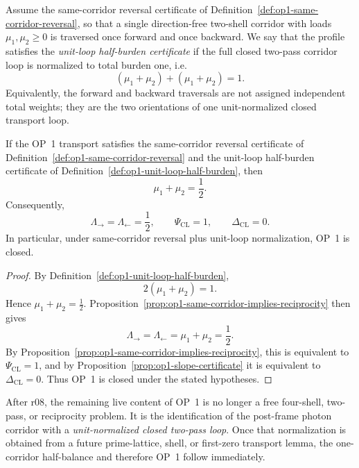 \begin{definition}
\label{def:op1-unit-loop-half-burden}
Assume the same-corridor reversal certificate of Definition~\ref{def:op1-same-corridor-reversal}, so that a single direction-free two-shell corridor with loads \(\mu_1,\mu_2\ge 0\) is traversed once forward and once backward. We say that the profile satisfies the \emph{unit-loop half-burden certificate} if the full closed two-pass corridor loop is normalized to total burden one, i.e.
\[
  (\mu_1+\mu_2)+(\mu_1+\mu_2)=1.
\]
Equivalently, the forward and backward traversals are not assigned independent total weights; they are the two orientations of one unit-normalized closed transport loop.
\end{definition}

\begin{proposition}
\label{prop:op1-unit-loop-half-burden}
If the OP~1 transport satisfies the same-corridor reversal certificate of Definition~\ref{def:op1-same-corridor-reversal} and the unit-loop half-burden certificate of Definition~\ref{def:op1-unit-loop-half-burden}, then
\[
  \mu_1+\mu_2=\frac12.
\]
Consequently,
\[
  \Lambda_{\rightarrow}=\Lambda_{\leftarrow}=\frac12,
\qquad
  \Psi_{\mathrm{CL}}=1,
\qquad
  \Delta_{\mathrm{CL}}=0.
\]
In particular, under same-corridor reversal plus unit-loop normalization, OP~1 is closed.
\end{proposition}

\begin{proof}
By Definition~\ref{def:op1-unit-loop-half-burden},
\[
  2(\mu_1+\mu_2)=1.
\]
Hence \(\mu_1+\mu_2=\tfrac12\). Proposition~\ref{prop:op1-same-corridor-implies-reciprocity} then gives
\[
  \Lambda_{\rightarrow}=\Lambda_{\leftarrow}=\mu_1+\mu_2=\frac12.
\]
By Proposition~\ref{prop:op1-same-corridor-implies-reciprocity}, this is equivalent to \(\Psi_{\mathrm{CL}}=1\), and by Proposition~\ref{prop:op1-slope-certificate} it is equivalent to \(\Delta_{\mathrm{CL}}=0\). Thus OP~1 is closed under the stated hypotheses.
\end{proof}

\begin{corollary}
\label{cor:op1-live-burden-after-r08}
After r08, the remaining live content of OP~1 is no longer a free four-shell, two-pass, or reciprocity problem. It is the identification of the post-frame photon corridor with a \emph{unit-normalized closed two-pass loop}. Once that normalization is obtained from a future prime-lattice, shell, or first-zero transport lemma, the one-corridor half-balance and therefore OP~1 follow immediately.
\end{corollary}

